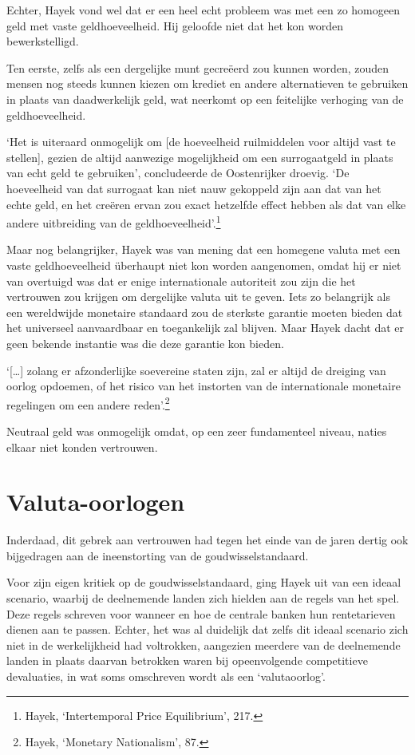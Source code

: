 \documentclass[
  a5paper,
  smalldemyvopaper,11pt,twoside,onecolumn,openright,extrafontsizes]{memoir}
\begin{document}
Echter, Hayek vond wel dat er een heel echt probleem was met een zo
homogeen geld met vaste geldhoeveelheid. Hij geloofde niet dat het kon
worden bewerkstelligd.

Ten eerste, zelfs als een dergelijke munt gecreëerd zou kunnen worden,
zouden mensen nog steeds kunnen kiezen om krediet en andere
alternatieven te gebruiken in plaats van daadwerkelijk geld, wat
neerkomt op een feitelijke verhoging van de geldhoeveelheid.

`Het is uiteraard onmogelijk om {[}de hoeveelheid ruilmiddelen voor
altijd vast te stellen{]}, gezien de altijd aanwezige mogelijkheid om
een surrogaatgeld in plaats van echt geld te gebruiken', concludeerde de
Oostenrijker droevig. `De hoeveelheid van dat surrogaat kan niet nauw
gekoppeld zijn aan dat van het echte geld, en het creëren ervan zou
exact hetzelfde effect hebben als dat van elke andere uitbreiding van de
geldhoeveelheid'.\footnote{\hspace{0pt}Hayek, `Intertemporal Price
  Equilibrium', 217.}

Maar nog belangrijker, Hayek was van mening dat een homegene valuta met
een vaste geldhoeveelheid überhaupt niet kon worden aangenomen, omdat
hij er niet van overtuigd was dat er enige internationale autoriteit zou
zijn die het vertrouwen zou krijgen om dergelijke valuta uit te geven.
Iets zo belangrijk als een wereldwijde monetaire standaard zou de
sterkste garantie moeten bieden dat het universeel aanvaardbaar en
toegankelijk zal blijven. Maar Hayek dacht dat er geen bekende instantie
was die deze garantie kon bieden.

`{[}\ldots{]} zolang er afzonderlijke soevereine staten zijn, zal er
altijd de dreiging van oorlog opdoemen, of het risico van het instorten
van de internationale monetaire regelingen om een andere
reden'.\footnote{\hspace{0pt}Hayek, `Monetary Nationalism', 87.}

Neutraal geld was onmogelijk omdat, op een zeer fundamenteel niveau,
naties elkaar niet konden vertrouwen.

\section{Valuta-oorlogen}\label{valuta-oorlogen}

Inderdaad, dit gebrek aan vertrouwen had tegen het einde van de jaren
dertig ook bijgedragen aan de ineenstorting van de goudwisselstandaard.

Voor zijn eigen kritiek op de goudwisselstandaard, ging Hayek uit van
een ideaal scenario, waarbij de deelnemende landen zich hielden aan de
regels van het spel. Deze regels schreven voor wanneer en hoe de
centrale banken hun rentetarieven dienen aan te passen. Echter, het was
al duidelijk dat zelfs dit ideaal scenario zich niet in de werkelijkheid
had voltrokken, aangezien meerdere van de deelnemende landen in plaats
daarvan betrokken waren bij opeenvolgende competitieve devaluaties, in
wat soms omschreven wordt als een `valutaoorlog'.
\end{document}
